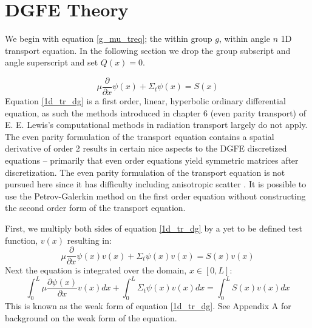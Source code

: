 \section{DGFE Theory}

We begin with equation \ref{g_mu_treq}; the within group $g$, within angle $n$ 1D transport equation.  In the following section we drop the group subscript and angle superscript and set $Q(x)=0$.

\begin{equation}
\mu \frac{\partial}{\partial x} \psi(x) + \Sigma_t \psi(x) = S(x)
\label{1d_tr_dg}
\end{equation}
Equation \ref{1d_tr_dg} is a first order, linear, hyperbolic ordinary differential equation, as such the methods introduced in chapter 6
(even parity transport) of E. E. Lewis’s computational methods in radiation transport largely do not apply. The even parity formulation of the transport equation contains a spatial derivative of order 2 results
in certain nice aspects to the DGFE discretized equations – primarily that even order equations yield
symmetric matrices after discretization. The even parity formulation of the transport equation is not pursued here
since it has difficulty including anisotropic scatter \cite{Lewis}. It is possible to use the Petrov-Galerkin method
on the first order equation without constructing the second order form of the transport equation.

First, we multiply both sides of equation \ref{1d_tr_dg} by a yet to be defined test function, $v(x)$ resulting in:
\begin{equation}
\mu \frac{\partial}{\partial x} \psi(x) v(x) + \Sigma_t \psi(x)v(x) = S(x)v(x)
\label{1d_tr_dg2}
\end{equation}
Next the equation is integrated over the domain, $x \in [0, L]$:
\begin{equation}
\int_0^L \mu \frac{\partial \psi(x)}{\partial x} v(x) dx + \int_0^L \Sigma_t \psi(x)v(x) dx =  \int_0^L S(x)v(x) dx
\label{1d_tr_weak}
\end{equation}
This is known as the weak form of equation \ref{1d_tr_dg}.
See Appendix A for background on the weak form of the equation.

